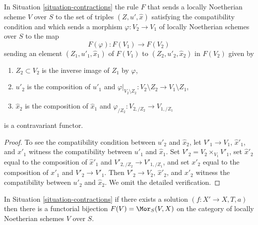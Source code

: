 \begin{lemma}
\label{lemma-functor}
In Situation \ref{situation-contractions} the rule $F$ that sends
a locally Noetherian scheme $V$ over $S$ to the set of triples
$(Z, u', \hat x)$ satisfying the compatibility condition and which sends a
morphism $\varphi : V_2 \to V_1$ of locally Noetherian schemes over $S$
to the map
$$
F(\varphi) : F(V_1) \longrightarrow F(V_2)
$$
sending an element $(Z_1, u'_1, \hat x_1)$ of $F(V_1)$ to
$(Z_2, u'_2, \hat x_2)$ in $F(V_2)$ given by
\begin{enumerate}
\item $Z_2 \subset V_2$ is the inverse image of $Z_1$ by $\varphi$,
\item $u'_2$ is the composition of $u'_1$ and
$\varphi|_{V_2 \setminus Z_2} : V_2 \setminus Z_2 \to V_1 \setminus Z_1$,
\item $\hat x_2$ is the composition of $\hat x_1$ and
$\varphi_{/Z_2} : V_{2, /Z_2} \to V_{1, /Z_1}$
\end{enumerate}
is a contravariant functor.
\end{lemma}

\begin{proof}
To see the compatibility condition between $u'_2$ and $\hat x_2$, let
$V'_1 \to V_1$, $\hat x'_1$, and $x'_1$ witness the compatibility between
$u'_1$ and $\hat x_1$. Set $V'_2 = V_2 \times_{V_1} V'_1$, set
$\hat x'_2$ equal to the composition of $\hat x'_1$ and
$V'_{2, /Z_2} \to V'_{1, /Z_1}$, and set $x'_2$
equal to the composition of $x'_1$ and $V'_2 \to V'_1$.
Then $V'_2 \to V_2$, $\hat x'_2$, and $x'_2$ witness the compatibility between
$u'_2$ and $\hat x_2$. We omit the detailed verification.
\end{proof}

\begin{lemma}
\label{lemma-solution}
In Situation \ref{situation-contractions} if there exists a solution
$(f : X' \to X, T, a)$ then there is a functorial bijection
$F(V) = \Mor_S(V, X)$ on the category of
locally Noetherian schemes $V$ over $S$.
\end{lemma}

